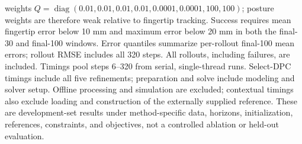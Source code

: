 \begin{table}[htbp]
{weights $Q=\operatorname{diag}(0.01,0.01,0.01,0.01,0.0001,0.0001,100,100)$;
posture weights are therefore weak relative to fingertip tracking.
Success requires mean fingertip error below 10 mm and maximum error below
20 mm in both the final-30 and final-100 windows. Error quantiles summarize
per-rollout final-100 mean errors; rollout RMSE includes all 320 steps.
All rollouts, including failures, are included. Timings pool steps 6--320
from serial, single-thread runs. Select-DPC timings include all five
refinements; preparation and solve include modeling and solver setup.
Offline processing and simulation are excluded; contextual timings also
exclude loading and construction of the externally supplied reference.
These are development-set
results under method-specific data, horizons, initialization, references,
constraints, and objectives, not a controlled ablation or held-out evaluation.}
\label{tab:reacher-three-methods-no-graph}
\end{table}
